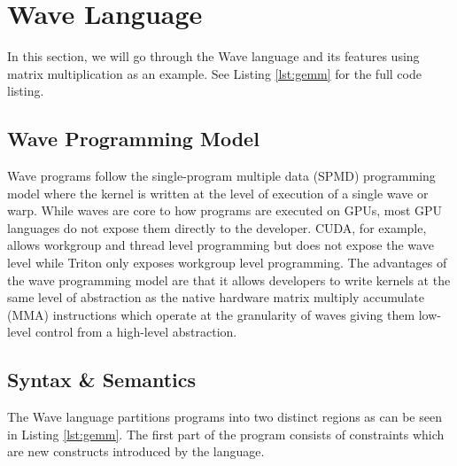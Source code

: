 \documentclass{article}
\begin{document}
\section{Wave Language}
In this section, we will go through the Wave language and its features using matrix multiplication as an example. See Listing \ref{lst:gemm} for the full code listing.

\label{section:wave_language}
\subsection{Wave Programming Model}
Wave programs follow the single-program multiple data (SPMD) programming model where the kernel is written
at the level of execution of a single wave or warp. While waves are core to how programs are executed on
GPUs, most GPU languages do not expose them directly to the developer. CUDA, for example, allows workgroup
and thread level programming but does not expose the wave level while Triton only exposes workgroup level programming.
The advantages of the wave programming model are that it allows developers to write kernels at the same level of
abstraction as the native hardware matrix multiply accumulate (MMA) instructions which operate at the granularity of waves
giving them low-level control from a high-level abstraction.


\subsection{Syntax \& Semantics}
The Wave language partitions programs into two distinct regions as can be seen in Listing \ref{lst:gemm}.
The first part of the program consists of constraints which are new constructs introduced by the language.
\end{document}
